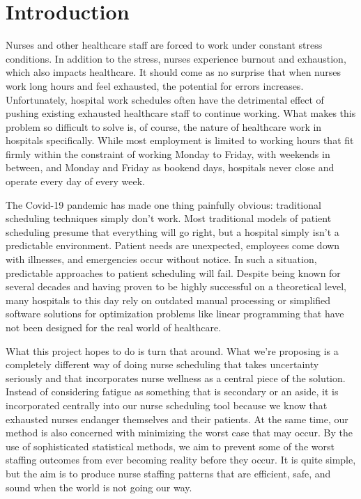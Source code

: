\documentclass[10pt,a4paper,twocolumn]{article}
\begin{document}
\section{Introduction}

Nurses and other healthcare staff are forced to work under constant stress conditions. In addition to the stress, nurses experience burnout and exhaustion, which also impacts healthcare. It should come as no surprise that when nurses work long hours and feel exhausted, the potential for errors increases. Unfortunately, hospital work schedules often have the detrimental effect of pushing existing exhausted healthcare staff to continue working. What makes this problem so difficult to solve is, of course, the nature of healthcare work in hospitals specifically. While most employment is limited to working hours that fit firmly within the constraint of working Monday to Friday, with weekends in between, and Monday and Friday as bookend days, hospitals never close and operate every day of every week.

The Covid-19 pandemic has made one thing painfully obvious: traditional scheduling techniques simply don’t work. Most traditional models of patient scheduling presume that everything will go right, but a hospital simply isn’t a predictable environment. Patient needs are unexpected, employees come down with illnesses, and emergencies occur without notice. In such a situation, predictable approaches to patient scheduling will fail. Despite being known for several decades and having proven to be highly successful on a theoretical level, many hospitals to this day rely on outdated manual processing or simplified software solutions for optimization problems like linear programming that have not been designed for the real world of healthcare.

What this project hopes to do is turn that around. What we're proposing is a completely different way of doing nurse scheduling that takes uncertainty seriously and that incorporates nurse wellness as a central piece of the solution. Instead of considering fatigue as something that is secondary or an aside, it is incorporated centrally into our nurse scheduling tool because we know that exhausted nurses endanger themselves and their patients. At the same time, our method is also concerned with minimizing the worst case that may occur. By the use of sophisticated statistical methods, we aim to prevent some of the worst staffing outcomes from ever becoming reality before they occur. It is quite simple, but the aim is to produce nurse staffing patterns that are efficient, safe, and sound when the world is not going our way.
\end{document}
